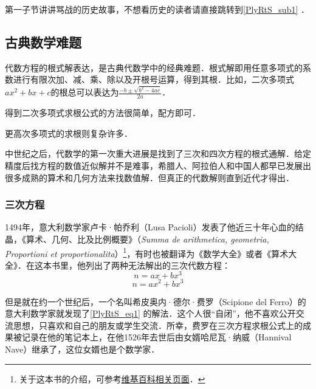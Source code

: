



第一子节讲讲骂战的历史故事，不想看历史的读者请直接跳转到\autoref{PlyRtS_sub1} ．

\subsection{古典数学难题}

代数方程的根式解表达，是古典代数学中的经典难题．根式解即用任意多项式的系数进行有限次加、减、乘、除以及开根号运算，得到其根．比如，二次多项式$ax^2+bx+c$的根总可以表达为$\frac{-b\pm\sqrt{b^2-4ac}}{2a}$．

得到二次多项式求根公式的方法很简单，配方即可．

更高次多项式的求根则复杂许多．

中世纪之后，代数学的第一次重大进展是找到了三次和四次方程的根式通解．给定精度后找方程的数值近似解并不是难事，希腊人、阿拉伯人和中国人都早已发展出很多成熟的算术和几何方法来找数值解．但真正的代数解则直到近代才得出．

\subsubsection{三次方程}

1494年，意大利数学家卢卡·帕乔利（Lusa Pacioli）发表了他近三十年心血的结晶，《算术、几何、比及比例概要》（\textsl{Summa de arithmetica, geometria, Proportioni et proportionalita}）\footnote{关于这本书的介绍，可参考\href{https://en.wikipedia.org/wiki/Summa_de_arithmetica}{维基百科相关页面}．}，有时也被翻译为《数学大全》或者《算术大全》．在这本书里，他列出了两种无法解出的三次代数方程：
\begin{equation}\label{PlyRtS_eq1}
n=ax+bx^3
\end{equation}
\begin{equation}\label{PlyRtS_eq2}
n=ax^2+bx^3
\end{equation}

但是就在约一个世纪后，一个名叫希皮奥内·德尔·费罗（Scipione del Ferro）的意大利数学家就发现了\autoref{PlyRtS_eq1} 的解法．这个人很“自闭”，他不喜欢公开交流思想，只喜欢和自己的朋友或学生交流．所幸，费罗在三次方程求根公式上的成果被记录在他的笔记本上，在他1526年去世后由女婿哈尼瓦·纳威（Hannival Nave）继承了，这位女婿也是个数学家．


